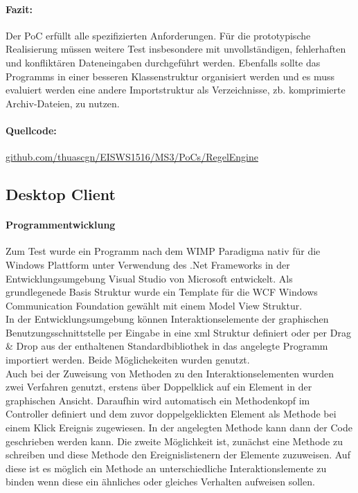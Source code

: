 \documentclass[11pt,oneside,a4paper,notitlepage]{article}
\begin{document}
\paragraph*{Fazit:} Der PoC erfüllt alle spezifizierten Anforderungen. Für die prototypische Realisierung müssen weitere Test insbesondere mit unvollständigen, fehlerhaften und konfliktären Dateneingaben durchgeführt werden. Ebenfalls sollte das Programms in einer besseren Klassenstruktur organisiert werden und es muss evaluiert werden eine andere Importstruktur als Verzeichnisse, zb. komprimierte Archiv-Dateien, zu nutzen.
\paragraph*{Quellcode: } \href{}{github.com/thuascgn/EISWS1516/MS3/PoCs/RegelEngine}


\subsection{Desktop Client}
%
\paragraph*{Programmentwicklung}
Zum Test wurde ein Programm nach dem WIMP Paradigma nativ für die Windows Plattform unter Verwendung des .Net Frameworks in der Entwicklungsumgebung Visual Studio 
von Microsoft entwickelt. 
Als grundlegenede Basis Struktur wurde ein Template für die WCF Windows Communication Foundation gewählt mit einem Model View Struktur.\\
In der Entwicklungsumgebung können Interaktionselemente der graphischen Benutzungsschnittstelle per Eingabe in eine xml Struktur definiert oder per Drag \& Drop aus der enthaltenen Standardbibliothek in das angelegte Programm importiert werden. Beide Möglichekeiten wurden genutzt.\\
Auch bei der Zuweisung von Methoden zu den Interaktionselementen wurden zwei Verfahren genutzt, erstens über Doppelklick auf ein Element in der graphischen Ansicht. Daraufhin 
wird automatisch ein Methodenkopf im Controller definiert und dem zuvor doppelgeklickten Element als Methode bei einem Klick Ereignis zugewiesen. In der angelegten Methode kann dann der Code geschrieben werden kann. Die zweite Möglichkeit ist, zunächst eine Methode zu schreiben und diese Methode den Ereignislistenern der Elemente zuzuweisen. Auf diese ist es möglich ein Methode 
an unterschiedliche Interaktionslemente zu binden wenn diese ein ähnliches oder gleiches Verhalten aufweisen sollen.
\end{document}
